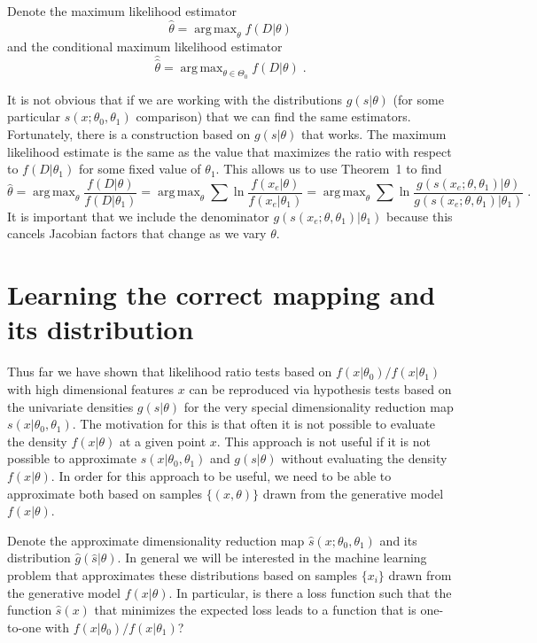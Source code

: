 \documentclass[11pt, oneside]{article}   	%
\DeclareMathOperator*{\argmax}{arg\,max}
\begin{document}
Denote the maximum likelihood estimator
\begin{equation}\label{eq:mle}
\hat{\theta} = \argmax_\theta  f(D | \theta)
\end{equation}
and the conditional maximum likelihood estimator
\begin{equation}
\hat{\hat{\theta}} = \argmax_{\theta \in \Theta_0}  f(D | \theta) \; .
\end{equation}

It is not obvious that if we are working with the distributions $g(s|\theta)$ (for some particular $s(x; \theta_0, \theta_1)$ comparison) that we can find the same estimators. 
Fortunately, there is a construction based on $g(s|\theta)$ that works. The maximum likelihood estimate is the same as the value that maximizes the ratio with respect to $f(D|\theta_1)$ for some fixed value of $\theta_1$. This allows us to use Theorem~1 to find
\begin{equation}
\hat{\theta} = \argmax_\theta \frac{ f(D | \theta)}{ f(D | \theta_1)} = \argmax_\theta  \sum \ln \frac{f(x_e | \theta)}{f(x_e|\theta_1)} = \argmax_\theta  \sum \ln \frac{g(s(x_e; \theta, \theta_1) | \theta)}{g(s(x_e; \theta, \theta_1) |\theta_1)} \; .
\end{equation}
It is important that we include the denominator $g(s(x_e; \theta, \theta_1) |\theta_1)$ because this cancels Jacobian factors that change as we vary $\theta$.

\section{Learning the correct mapping and its distribution}\label{S:classifier}

Thus far we have shown that likelihood ratio tests based on $f(x|\theta_0)/f(x|\theta_1)$ with high dimensional features $x$ can be reproduced via hypothesis tests based on the univariate densities $g(s|\theta)$ for the very special dimensionality reduction map $s(x|\theta_0, \theta_1)$. The motivation for this is that often it is not possible to evaluate the density $f(x|\theta)$ at a given point $x$.  This approach is not useful if it is not possible to approximate $s(x|\theta_0, \theta_1)$ and $g(s|\theta)$ without evaluating the density $f(x|\theta)$. In order for this approach to be useful, we need to be able to approximate both based on samples $\{(x,\theta)\}$ drawn from the generative model $f(x|\theta)$.  

Denote the approximate dimensionality reduction map $\hat{s}(x; \theta_0, \theta_1)$ and its distribution $\hat{g}(\hat{s}|\theta)$. In general we will be interested in the machine learning problem that approximates these distributions based on samples $\{x_i\}$ drawn from the generative model $f(x|\theta)$.  In particular, 
is there a loss function such that the function $\hat{s}(x)$ that minimizes the expected loss leads to a function
that is one-to-one with $f(x|\theta_0)/f(x|\theta_1)$?
\end{document}
